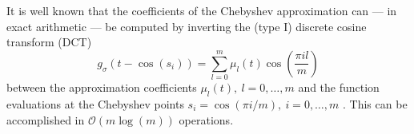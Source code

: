 It is well known that the coefficients of the Chebyshev approximation  can --- in exact arithmetic --- be computed by inverting the (type I) discrete cosine transform (DCT)
\begin{equation}
    g_{\sigma}(t - \cos(s_i)) = \sum_{l=0}^{m} \mu_l(t) \cos\left(\frac{\pi i l}{m} \right)
    \label{equ:discrete-cosine-transform}
\end{equation}
between the approximation coefficients $\mu_l(t),~l=0,\dots,m$ and the function evaluations at the Chebyshev points $s_i = \cos(\pi i / m),~i=0,\dots,m$ \cite{baszenski-1997-fast-polynomial, plonka-2018-numerical-fourier, trefethen-2020-approximation-theory}. This can be accomplished in $\mathcal{O}(m \log(m))$ operations.%

